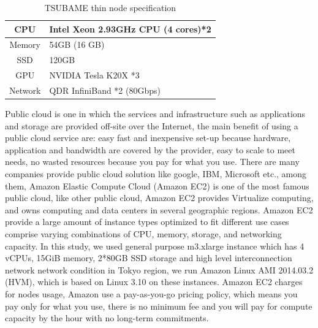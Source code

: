 \begin{table}[h]
\caption{\small TSUBAME thin node specification}
\label{tbl:spec}
\begin{center}
\begin{tabular}{|c|l|}
  \hline
  \cellcolor{lightgray} CPU      & Intel Xeon 2.93GHz CPU (4 cores)*2\\
  \hline
  \cellcolor{lightgray} Memory   & 54GB (16 GB)    \\
  \hline
  \cellcolor{lightgray} SSD      & 120GB \\
  \hline
  \cellcolor{lightgray} GPU	 & NVIDIA Tesla K20X *3\\
  \hline
  \cellcolor{lightgray} Network  & QDR InfiniBand *2 (80Gbps)\\
  \hline
\end{tabular}
\end{center}
\end{table}

Public cloud is one in which the services and infrastructure such as applications and storage are provided off-site over the Internet, the main benefit of using a public cloud service are: easy fast and inexpensive set-up because hardware, application and bandwidth are covered by the provider, easy to scale to meet needs, no wasted resources because you pay for what you use.
There are many companies provide public cloud solution like google, IBM, Microsoft etc., among them, Amazon Elastic Compute Cloud (Amazon EC2)\cite{AMAZON_AWS} is one of the most famous public cloud, like other public cloud, Amazon EC2 provides Virtualize computing, and owns computing and data centers in several geographic regions.
Amazon EC2 provide a large amount of instance types optimized to fit different use cases comprise varying combinations of CPU, memory, storage, and networking capacity.
In this study, we used general purpose m3.xlarge instance which has 4 vCPUs, 15GiB memory, 2*80GB SSD storage and high level interconnection network network condition in Tokyo region, we run Amazon Linux AMI 2014.03.2 (HVM), which is based on Linux 3.10 on these instances.
Amazon EC2 charges for nodes usage, Amazon use a pay-as-you-go pricing policy\cite{AMAZON_AWS}, which means you pay only for what you use, there is no minimum fee and you will pay for compute capacity by the hour with no long-term commitments.
